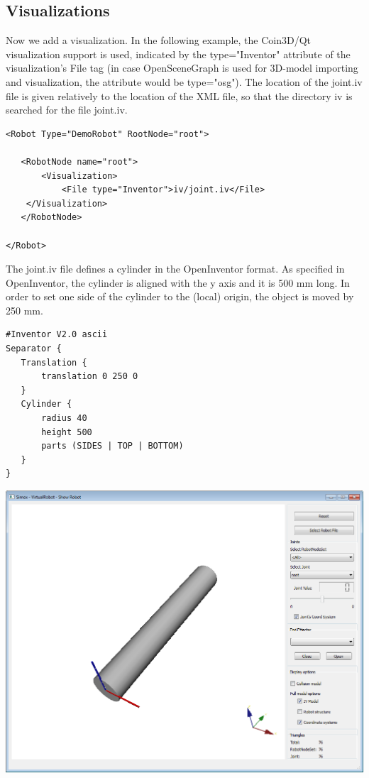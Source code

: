 \documentclass{book}
\begin{document}
\subsection{Visualizations}
\par
Now we add a visualization. In the following example, the Coin3D/Qt visualization support is used, indicated by the type="Inventor" attribute of the visualization's File tag (in case OpenSceneGraph is used for 3D-model importing and visualization, the attribute would be type="osg"). The location of the joint.iv file is given relatively to the location of the XML file, so that the directory iv is searched for the file joint.iv. 
\begin{lstlisting}
<Robot Type="DemoRobot" RootNode="root">

   <RobotNode name="root">
       <Visualization>
           <File type="Inventor">iv/joint.iv</File>
    </Visualization>
   </RobotNode>

</Robot>
\end{lstlisting}
\par
The joint.iv file defines a cylinder in the OpenInventor format. As specified in OpenInventor, the cylinder is aligned with the y axis and it is 500 mm long. In order to set one side of the cylinder to the (local) origin, the object is moved by 250 mm. 
\par
\begin{lstlisting}
#Inventor V2.0 ascii
Separator {
   Translation {
       translation 0 250 0
   }
   Cylinder {
       radius 40
       height 500
       parts (SIDES | TOP | BOTTOM)
   }
}
\end{lstlisting}
\includegraphics[width=\textwidth]{Tutorial2}
\par
\end{document}
